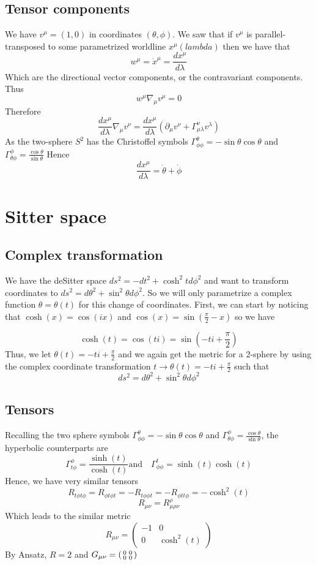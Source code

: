 \documentclass{article}
\begin{document}
	\subsection{Tensor components}
		We have $v^\mu = (1,0)$ in coordinates $(\theta, \phi)$. We saw that if $v^\mu$ is parallel-transposed to some parametrized worldline $x^\mu(lambda)$ then we have that
		$$ w^\mu = \dot{x}^\mu = \frac{dx^\mu}{d\lambda}$$
		Which are the directional vector components, or the contravariant components. Thus
		$$ w^\mu \nabla_\mu v^\mu = 0$$
		Therefore
		$$ \frac{dx^\mu}{d\lambda} \nabla_\mu v^\nu = \frac{dx^\mu}{d\lambda} \left( \partial_\mu v^\nu + \Gamma_{\mu \lambda}^\nu v^\lambda \right)$$
		As the two-sphere $S^2$ has the Christoffel symbols $\Gamma_{\phi\phi}^\theta = -\sin\theta\cos\theta$ and $\Gamma_{\theta\phi}^\phi = \frac{\cos\theta}{\sin\theta}$
		Hence
		$$ \frac{dx^\mu}{d\lambda} = \dot{\theta} + \dot{\phi} $$
	\pagebreak
	\section{Sitter space}
		\subsection{Complex transformation}
		We have the deSitter space $ds^2 = -dt^2 + 
		\cosh^2 t d\phi^2$ and want to transform coordinates to $ds^2 = d\theta^2 + \sin^2 \theta d\phi^2$. So we will only parametrize a complex function $\theta = \theta (t)$ for this change of coordinates. First, we can start by noticing that $\cosh(x) = \cos(ix)$ and $\cos (x) = \sin\left(\frac\pi2 - x\right)$ so we have
		
		$$ \cosh(t) = \cos(ti) = \sin\left( -ti + \frac\pi2  \right)$$
		Thus, we let $\theta(t) = -ti + \frac\pi2$ and we again get the metric for a 2-sphere by using the complex coordinate transformation $t \to \theta(t) = -ti + \frac{\pi}{2}$ such that
		$$ ds^2 = d\theta^2 + \sin^2 \theta d\phi^2$$
		\subsection{Tensors}
		
		Recalling the two sphere symbols $\Gamma_{\phi\phi}^\theta = -\sin\theta\cos\theta$ and $\Gamma_{\theta\phi}^\phi = \frac{\cos\theta}{\sin\theta}$, the hyperbolic counterparts are
		$$\Gamma_{t\phi}^\phi = \frac{\sinh(t)}{\cosh(t)} \text{and} \quad \Gamma_{\phi\phi}^t = \sinh(t)\cosh(t)$$
		Hence, we have very similar tensors
		$$ R_{t\phi t\phi} = R_{\phi t \phi t} = -  R_{t \phi \phi t } = - R_{\phi t t \phi} = -\cosh^2(t) $$
		$$ R_{\mu\nu} = R^{\rho}_{\mu\rho\nu}$$
		Which leads to the similar metric
		$$ R_{\mu\nu} = \begin{pmatrix}
			-1 & 0 \\
			0 & \cosh^2 (t) 
		\end{pmatrix}$$
		By Ansatz, $R=2$ and $G_{\mu\nu} = \begin{psmallmatrix} 0 & 0 \\ 0 & 0
		\end{psmallmatrix}$
		
\end{document}
